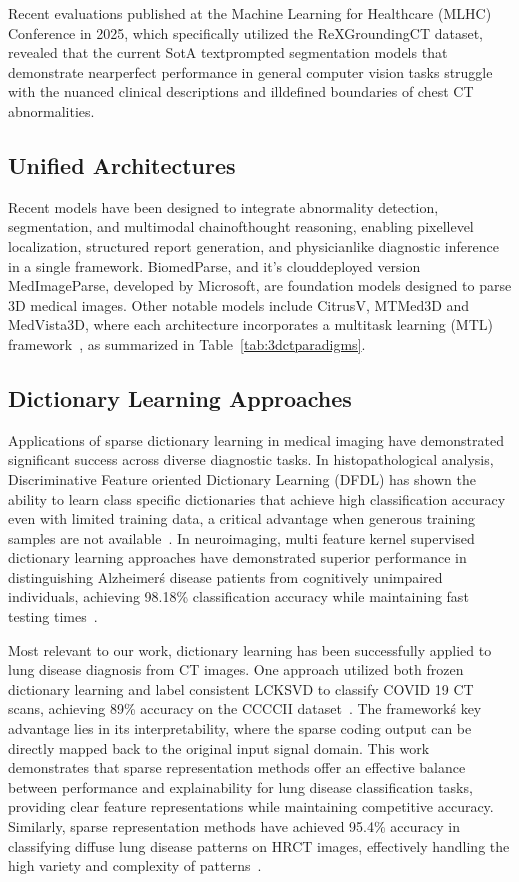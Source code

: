 Recent evaluations published at the Machine Learning for Healthcare (MLHC) Conference in 2025, which specifically utilized
the ReXGroundingCT dataset, revealed that the current SotA textprompted segmentation models that demonstrate nearperfect
performance in general computer vision tasks struggle with the nuanced clinical descriptions and illdefined boundaries
of chest CT abnormalities.

\subsection{Unified Architectures}
Recent models have been designed to integrate abnormality detection, segmentation, and multimodal chainofthought reasoning,
enabling pixellevel localization, structured report generation, and physicianlike diagnostic inference in a single framework.
BiomedParse, and it's clouddeployed version MedImageParse, developed by Microsoft, are foundation models designed to parse 3D
medical images.
Other notable models include CitrusV, MTMed3D and MedVista3D, where each architecture incorporates a multitask learning
(MTL) framework~\cite{citrusv2025,mtmed3d2025,medvista3d2025}, as summarized in Table~\ref{tab:3dctparadigms}.

\subsection{Dictionary Learning Approaches}
Applications of sparse dictionary learning in medical imaging have demonstrated significant success across diverse diagnostic tasks. In histopathological
analysis, Discriminative Feature oriented Dictionary Learning (DFDL) has shown the ability to learn class specific dictionaries that achieve high classification
accuracy even with limited training data, a critical advantage when generous training samples are not available~\cite{vu2016dfdl}. In neuroimaging, multi feature kernel supervised
dictionary learning approaches have demonstrated superior performance in distinguishing Alzheimer\'s disease patients from cognitively unimpaired individuals,
achieving 98.18\% classification accuracy while maintaining fast testing times~\cite{li2018mkscddl}.

Most relevant to our work, dictionary learning has been successfully applied to lung disease diagnosis from CT images. One approach utilized both frozen
dictionary learning and label consistent LCKSVD to classify COVID 19 CT scans, achieving 89\% accuracy on the CCCCII dataset~\cite{gould2007nodule}. The framework\'s key
advantage lies in its interpretability, where the sparse coding output can be directly mapped back to the original input signal domain. This work demonstrates that
sparse representation methods offer an effective balance between performance and explainability for lung disease classification tasks, providing clear feature
representations while maintaining competitive accuracy. Similarly, sparse representation methods have achieved 95.4\% accuracy in classifying diffuse lung disease
patterns on HRCT images, effectively handling the high variety and complexity of patterns~\cite{aberle2011nlst}.


